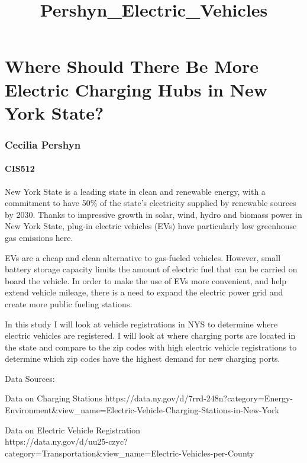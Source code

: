 \documentclass[11pt]{article}
\title{Pershyn\_Electric\_Vehicles}
\begin{document}
    
    
    \maketitle
    
    

    
    \section{Where Should There Be More Electric Charging Hubs in New York
State?}\label{where-should-there-be-more-electric-charging-hubs-in-new-york-state}

\subsubsection{Cecilia Pershyn}\label{cecilia-pershyn}

\paragraph{CIS512}\label{cis512}

New York State is a leading state in clean and renewable energy, with a
commitment to have 50\% of the state's electricity supplied by renewable
sources by 2030. Thanks to impressive growth in solar, wind, hydro and
biomass power in New York State, plug-in electric vehicles (EVs) have
particularly low greenhouse gas emissions here.

EVs are a cheap and clean alternative to gas-fueled vehicles. However,
small battery storage capacity limits the amount of electric fuel that
can be carried on board the vehicle. In order to make the use of EVs
more convenient, and help extend vehicle mileage, there is a need to
expand the electric power grid and create more public fueling stations.

In this study I will look at vehicle registrations in NYS to determine
where electric vehicles are registered. I will look at where charging
ports are located in the state and compare to the zip codes with high
electric vehicle registrations to determine which zip codes have the
highest demand for new charging ports.

Data Sources:

Data on Charging Stations
https://data.ny.gov/d/7rrd-248n?category=Energy-Environment\&view\_name=Electric-Vehicle-Charging-Stations-in-New-York

Data on Electric Vehicle Registration\\
https://data.ny.gov/d/uu25-czyc?category=Transportation\&view\_name=Electric-Vehicles-per-County
\end{document}
